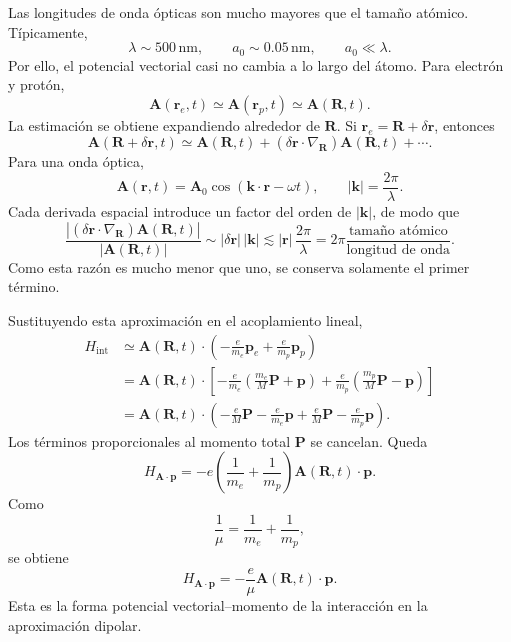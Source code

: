 \documentclass[11pt]{article}
\newcommand{\vb}[1]{\mathbf{#1}}
\begin{document}
Las longitudes de onda \'opticas son mucho mayores que el tama\~no at\'omico.
T\'ipicamente,
\begin{equation}
  \lambda\sim 500\,\mathrm{nm},
  \qquad
  a_0\sim 0.05\,\mathrm{nm},
  \qquad
  a_0\ll\lambda .
\end{equation}
Por ello, el potencial vectorial casi no cambia a lo largo del \'atomo. Para
electr\'on y prot\'on,
\begin{equation}
  \vb A(\vb r_e,t)
  \simeq
  \vb A(\vb r_p,t)
  \simeq
  \vb A(\vb R,t).
\end{equation}
La estimaci\'on se obtiene expandiendo alrededor de \(\vb R\). Si
\(\vb r_e=\vb R+\delta\vb r\), entonces
\begin{equation}
  \vb A(\vb R+\delta\vb r,t)
  \simeq
  \vb A(\vb R,t)
  +
  (\delta\vb r\cdot\nabla_{\vb R})\vb A(\vb R,t)+\cdots .
\end{equation}
Para una onda \'optica,
\begin{equation}
  \vb A(\vb r,t)
  =
  \vb A_0\cos(\vb k\cdot\vb r-\omega t),
  \qquad
  |\vb k|=\frac{2\pi}{\lambda}.
\end{equation}
Cada derivada espacial introduce un factor del orden de \(|\vb k|\), de modo
que
\begin{equation}
  \frac{
  |(\delta\vb r\cdot\nabla_{\vb R})\vb A(\vb R,t)|
  }{
  |\vb A(\vb R,t)|
  }
  \sim
  |\delta\vb r|\,|\vb k|
  \lesssim
  |\vb r|\,\frac{2\pi}{\lambda}
  =
  2\pi\frac{\text{tama\~no at\'omico}}{\text{longitud de onda}}.
\end{equation}
Como esta raz\'on es mucho menor que uno, se conserva solamente el primer
t\'ermino.

Sustituyendo esta aproximaci\'on en el acoplamiento lineal,
\begin{align}
  H_{\mathrm{int}}
  &\simeq
  \vb A(\vb R,t)\cdot
  \left(
    -\frac{e}{m_e}\vb p_e
    +
    \frac{e}{m_p}\vb p_p
  \right)                                                                     \\
  &=
  \vb A(\vb R,t)\cdot
  \left[
    -\frac{e}{m_e}
    \left(
      \frac{m_e}{M}\vb P+\vb p
    \right)
    +
    \frac{e}{m_p}
    \left(
      \frac{m_p}{M}\vb P-\vb p
    \right)
  \right]                                                                     \\
  &=
  \vb A(\vb R,t)\cdot
  \left(
    -\frac{e}{M}\vb P
    -\frac{e}{m_e}\vb p
    +\frac{e}{M}\vb P
    -\frac{e}{m_p}\vb p
  \right).
\end{align}
Los t\'erminos proporcionales al momento total \(\vb P\) se cancelan. Queda
\begin{equation}
  H_{\vb A\cdot\vb p}
  =
  -e
  \left(
    \frac{1}{m_e}+\frac{1}{m_p}
  \right)
  \vb A(\vb R,t)\cdot\vb p.
\end{equation}
Como
\begin{equation}
  \frac{1}{\mu}
  =
  \frac{1}{m_e}+\frac{1}{m_p},
\end{equation}
se obtiene
\begin{equation}
  \boxed{
  H_{\vb A\cdot\vb p}
  =
  -\frac{e}{\mu}
  \vb A(\vb R,t)\cdot\vb p .
  }
\end{equation}
Esta es la forma potencial vectorial--momento de la interacci\'on en la
aproximaci\'on dipolar.
\end{document}
